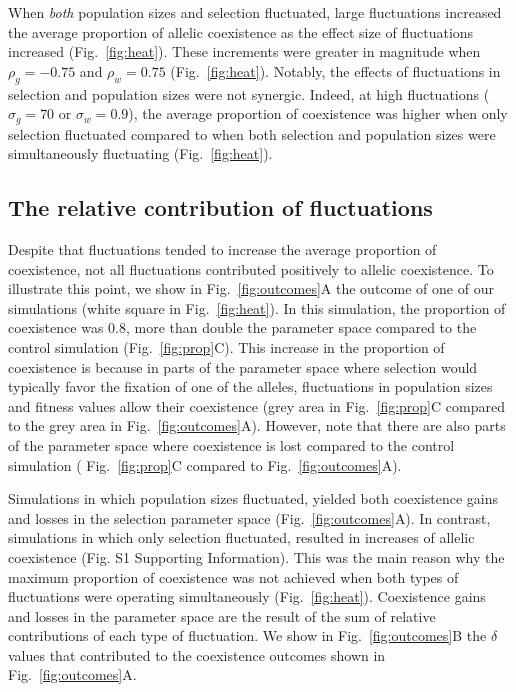 When \textit{both} population sizes and selection fluctuated,  large fluctuations  increased the average proportion of allelic coexistence  as the effect size of fluctuations increased (Fig.~\ref{fig:heat}). These increments were greater in magnitude when $\rho_{g}= -0.75$ and $\rho_{w}= 0.75$ (Fig.~\ref{fig:heat}). Notably, the effects of fluctuations in selection and population sizes were not synergic. Indeed, at high fluctuations ($\sigma_{g} = 70$ or $\sigma_{w} = 0.9$), the average proportion of coexistence was higher when only selection fluctuated compared to when both selection and population sizes were simultaneously fluctuating (Fig.~\ref{fig:heat}).


\subsection*{The relative contribution of fluctuations}

Despite that fluctuations tended to increase the average proportion of coexistence, not all fluctuations contributed positively to allelic coexistence. To illustrate this point, we show in Fig.~\ref{fig:outcomes}A the outcome of one of our simulations  (white square in Fig.~\ref{fig:heat}). In this simulation, the proportion of coexistence was 0.8, more than double the parameter space compared to the control simulation (Fig.~\ref{fig:prop}C). This increase in the proportion of coexistence is because in parts of the parameter space where selection would typically favor the fixation of one of the alleles, fluctuations in population sizes and fitness values allow their coexistence (grey area in Fig.~\ref{fig:prop}C compared to the grey area in Fig.~\ref{fig:outcomes}A). However, note that there are also parts of the parameter space where coexistence is lost compared to the control simulation ( Fig.~\ref{fig:prop}C compared to  Fig.~\ref{fig:outcomes}A).


Simulations in which population sizes fluctuated, yielded both coexistence gains and losses in the selection parameter space (Fig.~\ref{fig:outcomes}A). In contrast, simulations in which only selection fluctuated, resulted in increases of allelic coexistence (Fig. S1 Supporting Information). This was the main reason why the maximum proportion of coexistence was not achieved when both types of fluctuations were operating simultaneously (Fig.~\ref{fig:heat}). Coexistence gains and losses in the parameter space are the result of the sum of relative contributions of each type of fluctuation.  We show in Fig.~\ref{fig:outcomes}B the $\delta$ values that contributed to the coexistence outcomes shown in Fig.~\ref{fig:outcomes}A.

